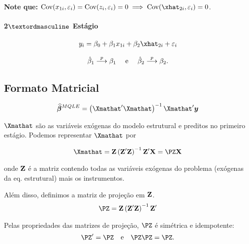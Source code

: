 \documentclass[11pt, oneside, a4paper, article]{article}
\numberwithin{equation}{section}
\begin{document}
\begin{description}
\noindent
\textbf{Note que:}
	$\Cov(x_{1i}, \err_{i}) = \Cov(z_{i}, \err_{i}) = 0 \implies \Cov(\xhat_{2i}, \err_i) = 0$.	

\paragraph{2$\textordmasculine$ Estágio}

\begin{align*}
	y_{i} = \beta_{0} + \beta_{1} x_{1i} + \beta_{2} \xhat_{2i} + \err_{i}
\end{align*}

\vspace{-2 em}
\begin{align*}
	\hat{\beta}_{1}  \overset{p}{\longrightarrow}  \beta_{1}
\quad	\text{ e } \quad
	\hat{\beta}_{2}  \overset{p}{\longrightarrow}  \beta_{2}.
\end{align*}

\subsection*{Formato Matricial}

\vspace{-2 em}
\begin{align*}
	\betavechat^{MQLE} = \left( \Xmathat' \Xmathat \right)^{-1} \Xmathat' \yvec
\end{align*}

\noindent 
$\Xmathat$ são as variáveis exógenas do modelo estrutural e preditos no primeiro estágio.
Podemos representar $\Xmathat$ por

\vspace{-1 em}
\begin{align*}
	\Xmathat = \Zmat \left( \Zmat' \Zmat  \right)^{-1} \Zmat' \Xmat = \PZ \Xmat
\end{align*}

\noindent
onde $\mathbf{Z}$ é a matriz contendo todas as variáveis exógenas do problema (exógenas da eq. estrutural) mais os instrumentos.

Além disso, definimos a matriz de projeção em $\mathbf{Z}$.
\begin{align*}
	\PZ = \Zmat \left( \Zmat' \Zmat  \right)^{-1} \Zmat' 
\end{align*}

\noindent
Pelas propriedades das matrizes de projeção, $\PZ$ é simétrica e idempotente:
\begin{align*}
	\PZ' = \PZ \quad \text{e} \quad \PZ \PZ = \PZ.
\end{align*}


\end{description}
\end{document}
